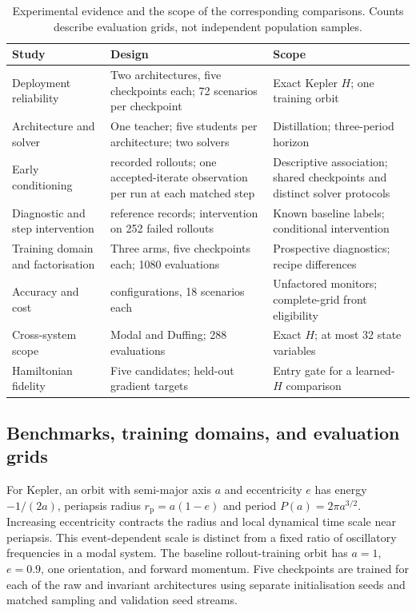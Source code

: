 \documentclass[final,3p,times]{elsarticle}
\begin{document}
\begin{table}[t]
\centering
\begingroup
\renewcommand{\baselinestretch}{1}
\small
\caption{Experimental evidence and the scope of the corresponding comparisons.
Counts describe evaluation grids, not independent population samples.}
\label{tab:evidence-scope}
\begin{tabular}{@{}>{\raggedright\arraybackslash}p{}
>{\raggedright\arraybackslash}p{}
>{\raggedright\arraybackslash}p{}@{}}
\toprule
Study & Design & Scope \\
\midrule
Deployment reliability & Two architectures, five checkpoints each;
72 scenarios per checkpoint & Exact Kepler $H$; one training orbit \\
Architecture and solver & One teacher; five students per architecture;
two solvers & Distillation; three-period horizon \\
Early conditioning & 1056 recorded rollouts; one accepted-iterate
observation per run at each matched step & Descriptive association;
shared checkpoints and distinct solver protocols \\
Diagnostic and step intervention & 396 reference records; intervention
on 252 failed rollouts & Known baseline labels; conditional intervention \\
Training domain and factorisation & Three arms, five checkpoints each;
1080 evaluations & Prospective diagnostics; recipe differences \\
Accuracy and cost & 38 configurations, 18 scenarios each & Unfactored
monitors; complete-grid front eligibility \\
Cross-system scope & Modal and Duffing; 288 evaluations & Exact $H$;
at most 32 state variables \\
Hamiltonian fidelity & Five candidates; held-out gradient targets &
Entry gate for a learned-$H$ comparison \\
\bottomrule
\end{tabular}
\endgroup
\end{table}

\subsection{Benchmarks, training domains, and evaluation grids}
\label{sec:benchmark-design}
For Kepler, an orbit with semi-major axis $a$ and eccentricity $e$ has
energy $-1/(2a)$, periapsis radius $r_{\mathrm p}=a(1-e)$ and period
$P(a)=2\pi a^{3/2}$. Increasing eccentricity contracts the radius and
local dynamical time scale near periapsis. This event-dependent scale is
distinct from a fixed ratio of oscillatory frequencies in a modal system.
The baseline rollout-training orbit has $a=1$, $e=0.9$, one orientation,
and forward momentum. Five checkpoints are trained for each of the raw
and invariant architectures using separate initialisation seeds and
matched sampling and validation seed streams.
\end{document}
